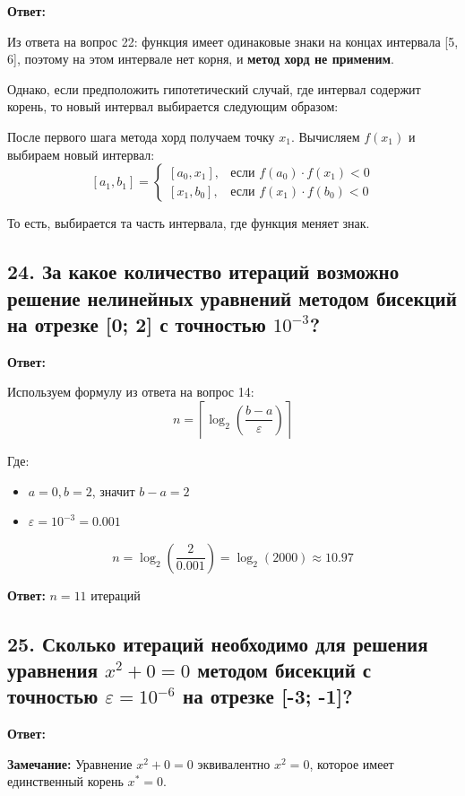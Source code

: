 \documentclass[a4paper,12pt]{article}
\begin{document}
\textbf{Ответ:} 

Из ответа на вопрос 22: функция имеет одинаковые знаки на концах интервала [5, 6], поэтому на этом интервале нет корня, и \textbf{метод хорд не применим}.

Однако, если предположить гипотетический случай, где интервал содержит корень, то новый интервал выбирается следующим образом:

После первого шага метода хорд получаем точку $x_1$. Вычисляем $f(x_1)$ и выбираем новый интервал:
\[
[a_1, b_1] = \begin{cases}
[a_0, x_1], & \text{если } f(a_0) \cdot f(x_1) < 0 \\
[x_1, b_0], & \text{если } f(x_1) \cdot f(b_0) < 0
\end{cases}
\]

То есть, выбирается та часть интервала, где функция меняет знак.

\subsection*{24. За какое количество итераций возможно решение нелинейных уравнений методом бисекций на отрезке [0; 2] с точностью $10^{-3}$?}

\textbf{Ответ:} 

Используем формулу из ответа на вопрос 14:
\[
    n = \left\lceil \log_2 \left( \frac{b - a}{\varepsilon} \right) \right\rceil
\]

Где:
\begin{itemize}
    \item $a = 0, b = 2$, значит $b - a = 2$
    \item $\varepsilon = 10^{-3} = 0.001$
\end{itemize}

\[
    n = \log_2 \left( \frac{2}{0.001} \right) = \log_2(2000) \approx 10.97
\]

\textbf{Ответ:} $n = 11$ итераций

\subsection*{25. Сколько итераций необходимо для решения уравнения $x^2 + 0 = 0$ методом бисекций с точностью $\varepsilon = 10^{-6}$ на отрезке [-3; -1]?}

\textbf{Ответ:} 

\textbf{Замечание:} Уравнение $x^2 + 0 = 0$ эквивалентно $x^2 = 0$, которое имеет единственный корень $x^* = 0$.
\end{document}
